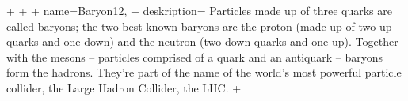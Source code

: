 +
 +  {
 +       name=Baryon12,
 +   deskription={ Particles made up of three quarks are called baryons; the two best known baryons are the proton (made up of two up quarks and one down) and the neutron (two down quarks and one up). Together with the mesons – particles comprised of a quark and an antiquark – baryons form the hadrons. They’re part of the name of the world’s most powerful particle collider, the Large Hadron Collider, the LHC. }
+}
